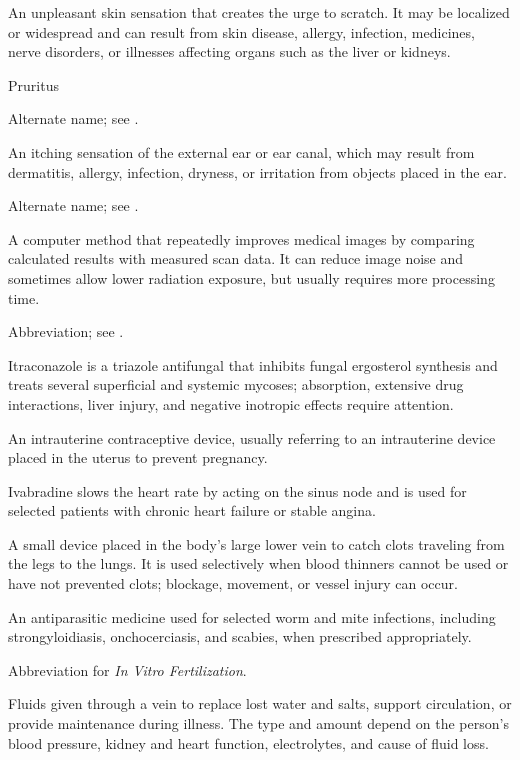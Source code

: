  An unpleasant skin sensation that creates the urge to scratch. It may be localized or widespread and can result from skin disease, allergy, infection, medicines, nerve disorders, or illnesses affecting organs such as the liver or kidneys.

\synonyms
Pruritus

 Alternate name; see .

 An itching sensation of the external ear or ear canal, which may result from dermatitis, allergy, infection, dryness, or irritation from objects placed in the ear.

 Alternate name; see .

 A computer method that repeatedly improves medical images by comparing calculated results with measured scan data. It can reduce image noise and sometimes allow lower radiation exposure, but usually requires more processing time.

 Abbreviation; see .

 Itraconazole is a triazole antifungal that inhibits fungal ergosterol synthesis and treats several superficial and systemic mycoses; absorption, extensive drug interactions, liver injury, and negative inotropic effects require attention.

 An intrauterine contraceptive device, usually referring to an intrauterine device placed in the uterus to prevent pregnancy.

 Ivabradine slows the heart rate by acting on the sinus node and is used for selected patients with chronic heart failure or stable angina.

 A small device placed in the body’s large lower vein to catch clots traveling from the legs to the lungs. It is used selectively when blood thinners cannot be used or have not prevented clots; blockage, movement, or vessel injury can occur.

 An antiparasitic medicine used for selected worm and mite infections, including strongyloidiasis, onchocerciasis, and scabies, when prescribed appropriately.

 Abbreviation for \textit{In Vitro Fertilization}.

 Fluids given through a vein to replace lost water and salts, support circulation, or provide maintenance during illness. The type and amount depend on the person’s blood pressure, kidney and heart function, electrolytes, and cause of fluid loss.


